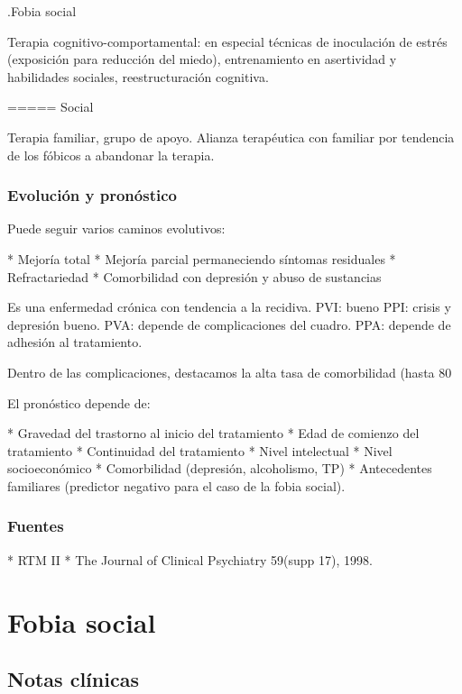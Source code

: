 \documentclass{scrbook}
\begin{document}
.Fobia social

Terapia cognitivo-comportamental: en especial técnicas de inoculación de estrés (exposición para reducción del miedo), entrenamiento en asertividad y habilidades sociales, reestructuración cognitiva.

===== Social

Terapia familiar, grupo de apoyo. Alianza terapéutica con familiar por tendencia de los fóbicos a abandonar la terapia.

\subsection*{Evolución y pronóstico}

Puede seguir varios caminos evolutivos:

* Mejoría total
* Mejoría parcial permaneciendo síntomas residuales
* Refractariedad
* Comorbilidad con depresión y abuso de sustancias

Es una enfermedad crónica con tendencia a la recidiva. PVI: bueno PPI: crisis y depresión bueno. PVA: depende de complicaciones del cuadro. PPA: depende de adhesión al tratamiento.

Dentro de las complicaciones, destacamos la alta tasa de comorbilidad (hasta 80%

El pronóstico depende de:

* Gravedad del trastorno al inicio del tratamiento
* Edad de comienzo del tratamiento
* Continuidad del tratamiento
* Nivel intelectual
* Nivel socioeconómico
* Comorbilidad (depresión, alcoholismo, TP)
* Antecedentes familiares (predictor negativo para el caso de la fobia social).

\subsection*{Fuentes}

* RTM II
* The Journal of Clinical Psychiatry 59(supp 17), 1998.

\chapter*{Fobia social}
\section*{Notas clínicas}
\end{document}
